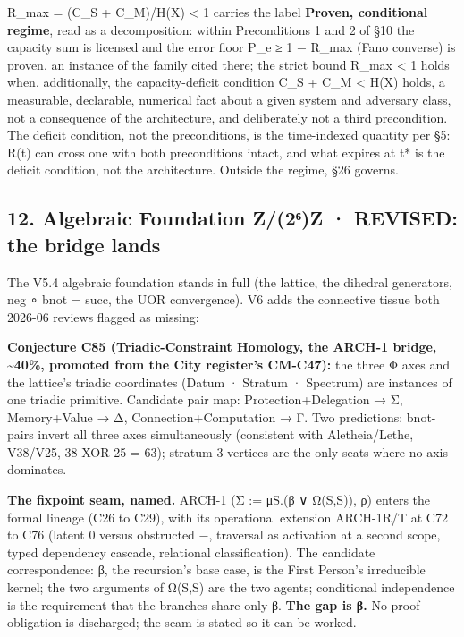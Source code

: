 \documentclass[
]{article}
\begin{document}
R\_max = (C\_S + C\_M)/H(X) \textless{} 1 carries the label
\textbf{Proven, conditional regime}, read as a decomposition: within
Preconditions 1 and 2 of §10 the capacity sum is licensed and the error
floor P\_e ≥ 1 − R\_max (Fano converse) is proven, an instance of the
family cited there; the strict bound R\_max \textless{} 1 holds when,
additionally, the capacity-deficit condition C\_S + C\_M \textless{}
H(X) holds, a measurable, declarable, numerical fact about a given
system and adversary class, not a consequence of the architecture, and
deliberately not a third precondition. The deficit condition, not the
preconditions, is the time-indexed quantity per §5: R(t) can cross one
with both preconditions intact, and what expires at t* is the deficit
condition, not the architecture. Outside the regime, §26 governs.

\subsection{12. Algebraic Foundation Z/(2⁶)Z · REVISED: the bridge
lands}\label{algebraic-foundation-z2ux2076z-revised-the-bridge-lands}

The V5.4 algebraic foundation stands in full (the lattice, the dihedral
generators, neg ∘ bnot = succ, the UOR convergence). V6 adds the
connective tissue both 2026-06 reviews flagged as missing:

\textbf{Conjecture C85 (Triadic-Constraint Homology, the ARCH-1 bridge,
\textasciitilde40\%, promoted from the City register's CM-C47):} the
three Φ axes and the lattice's triadic coordinates (Datum · Stratum ·
Spectrum) are instances of one triadic primitive. Candidate pair map:
Protection+Delegation → Σ, Memory+Value → Δ, Connection+Computation → Γ.
Two predictions: bnot-pairs invert all three axes simultaneously
(consistent with Aletheia/Lethe, V38/V25, 38 XOR 25 = 63); stratum-3
vertices are the only seats where no axis dominates.

\textbf{The fixpoint seam, named.} ARCH-1 (Σ := μS.(β ∨ Ω(S,S)), ρ)
enters the formal lineage (C26 to C29), with its operational extension
ARCH-1R/T at C72 to C76 (latent 0 versus obstructed −, traversal as
activation at a second scope, typed dependency cascade, relational
classification). The candidate correspondence: β, the recursion's base
case, is the First Person's irreducible kernel; the two arguments of
Ω(S,S) are the two agents; conditional independence is the requirement
that the branches share only β. \textbf{The gap is β.} No proof
obligation is discharged; the seam is stated so it can be worked.
\end{document}

